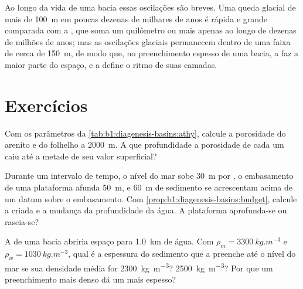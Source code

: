 Ao longo da vida de uma bacia essas oscilações são breves. Uma queda glacial de mais de
\qty{100}{m} em poucas dezenas de milhares de anos é rápida e grande comparada com a
, que soma um quilômetro ou mais apenas ao longo de dezenas de milhões de
anos; mas as oscilações glaciais permanecem dentro de uma faixa de cerca de \qty{150}{m}, de
modo que, no preenchimento espesso de uma bacia, a  faz a maior parte do espaço, e a
 define o ritmo de suas camadas.

\section{Exercícios}

\begin{exercise}[$\star$]\label{exo:b1:diagenesis-basins:1}
Com os parâmetros da \cref{tab:b1:diagenesis-basins:athy}, calcule a porosidade do arenito e
do folhelho a \qty{2000}{m}. A que profundidade a porosidade de cada um caiu até a metade de
seu valor superficial?
\end{exercise}

\begin{exercise}[$\star$]\label{exo:b1:diagenesis-basins:2}
Durante um intervalo de tempo, o nível do mar sobe \qty{30}{m} por , o embasamento de
uma plataforma afunda \qty{50}{m}, e \qty{60}{m} de sedimento se acrescentam acima de um datum
sobre o embasamento. Com \cref{prop:b1:diagenesis-basins:budget}, calcule a  criada
e a mudança da profundidade da água. A plataforma aprofunda-se ou raseia-se?
\end{exercise}

\begin{exercise}[$\star$]\label{exo:b1:diagenesis-basins:3}
A  de uma bacia abriria espaço para \qty{1.0}{km} de água. Com
$\rho_m = \qty{3300}{kg.m^{-3}}$ e $\rho_w = \qty{1030}{kg.m^{-3}}$, qual é a espessura do
sedimento que a preenche até o nível do mar se sua densidade média for
\qty{2300}{kg.m^{-3}}? \qty{2500}{kg.m^{-3}}? Por que um preenchimento mais denso dá um mais
espesso?
\end{exercise}

